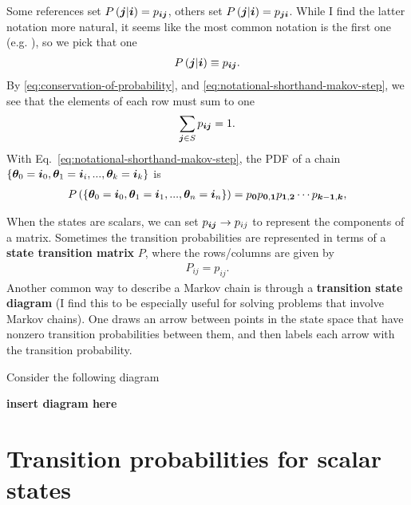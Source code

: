 Some references set $P\left({\bm j}|{\bm i}\right) = p_{{\bm i}{\bm j}}$, others set $P\left({\bm j}|{\bm i}\right) = p_{{\bm j}{\bm i}}$.
While I find the latter notation more natural, it seems like the most common notation is the first one (e.g. \cite{wasserman2010statistics,pishro2014introduction}), so we pick that one
\begin{align}
    \label{eq:notational-shorthand-makov-step}
    P\left({\bm j}|{\bm i}\right)
    \equiv
    p_{{\bm i}{\bm j}}
    .
\end{align}
By \eqref{eq:conservation-of-probability}, and \eqref{eq:notational-shorthand-makov-step}, we see that the elements of each row must sum to one
\begin{align}
    \label{eq:rows-sum-to-one}
    \sum_{{\bm j}\in S} p_{{\bm i}{\bm j}}
    =
    1
    .
\end{align}
With Eq.~\eqref{eq:notational-shorthand-makov-step}, the PDF of a chain $\left\{{\bm \theta}_0={\bm i}_0, {\bm \theta}_1={\bm i}_i, ... , {\bm \theta}_k={\bm i}_k\right\}$ is
\begin{align}
    P\left(\left\{{\bm \theta}_0={\bm i}_0, {\bm \theta}_1={\bm i}_1, ... , {\bm \theta}_n={\bm i}_n\right\}\right)
    =
    p_{{\bm 0}} p_{{\bm 0},{\bm 1}} p_{{\bm 1},{\bm 2}} \cdots p_{{\bm k}-{\bm 1},{\bm k}}
    ,
\end{align}

When the states are scalars, we can set $p_{{\bm i} {\bm j}} \to p_{ij}$ to represent the components of a matrix. 
Sometimes the transition probabilities are represented in terms of a \textbf{state transition matrix} $P$, where the rows/columns are given by
\begin{align}
    P_{ij}
    =
    p_{ij}
    .
\end{align}
Another common way to describe a Markov chain is through a \textbf{transition state diagram} (I find this to be especially useful for solving problems that involve Markov chains).
One draws an arrow between points in the state space that have nonzero transition probabilities between them, and then labels each arrow with the transition probability.

Consider the following diagram

\textbf{insert diagram here}

\section{Transition probabilities for scalar states\label{sec:transition-probabilities}}

